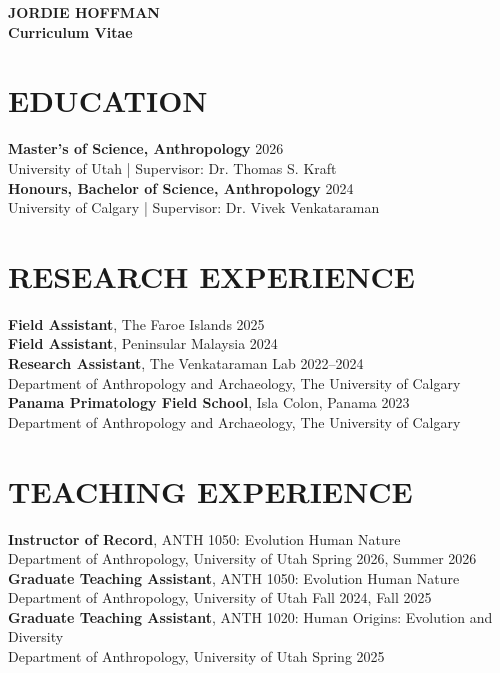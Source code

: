 \documentclass[a4paper,9pt]{extarticle}
\begin{document}
\pagestyle{empty}

\begin{center}
    \textbf{\Large JORDIE HOFFMAN }\\[2pt]
    \textbf{Curriculum Vitae}\\[1pt]
\end{center}

\section*{EDUCATION}
    \noindent \textbf{Master's of Science, Anthropology} \hfill 2026 \\
    University of Utah | Supervisor: Dr. Thomas S. Kraft \\[5pt]
    \noindent \textbf{Honours, Bachelor of Science, Anthropology} \hfill 2024 \\
    University of Calgary | Supervisor: Dr. Vivek Venkataraman

\section*{RESEARCH EXPERIENCE}
    \noindent \textbf{Field Assistant}, The Faroe Islands \hfill 2025 \\[5pt]
    \noindent \textbf{Field Assistant}, Peninsular Malaysia \hfill 2024 \\[5pt]
    \noindent \textbf{Research Assistant}, The Venkataraman Lab \hfill 2022--2024 \\
    Department of Anthropology and Archaeology, The University of Calgary \\[5pt]
    \noindent \textbf{Panama Primatology Field School}, Isla Colon, Panama \hfill 2023 \\
    Department of Anthropology and Archaeology, The University of Calgary

\section*{TEACHING EXPERIENCE}
    \noindent \textbf{Instructor of Record}, ANTH 1050: Evolution Human Nature \\
    Department of Anthropology, University of Utah \hfill Spring 2026, Summer 2026 \\[5pt]
    \noindent \textbf{Graduate Teaching Assistant}, ANTH 1050: Evolution Human Nature \\
    Department of Anthropology, University of Utah \hfill Fall 2024, Fall 2025 \\[5pt]
    \noindent \textbf{Graduate Teaching Assistant}, ANTH 1020: Human Origins: Evolution and Diversity \\
    Department of Anthropology, University of Utah \hfill Spring 2025
\end{document}
